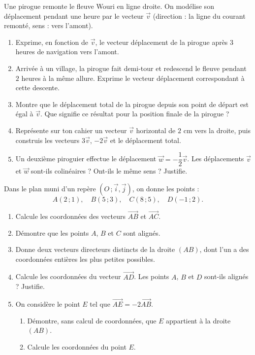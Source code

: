 \documentclass[11pt]{article}
\begin{document}
\begin{exercice}
Une pirogue remonte le fleuve Wouri en ligne droite. On modélise son déplacement pendant une heure par le vecteur $\vec{v}$ (direction : la ligne du courant remonté, sens : vers l'amont).
\begin{enumerate}
\item Exprime, en fonction de $\vec{v}$, le vecteur déplacement de la pirogue après $3$ heures de navigation vers l'amont.
\item Arrivée à un village, la pirogue fait demi-tour et redescend le fleuve pendant $2$ heures à la même allure. Exprime le vecteur déplacement correspondant à cette descente.
\item Montre que le déplacement total de la pirogue depuis son point de départ est égal à $\vec{v}$. Que signifie ce résultat pour la position finale de la pirogue ?
\item Représente sur ton cahier un vecteur $\vec{v}$ horizontal de $2$ cm vers la droite, puis construis les vecteurs $3\vec{v}$, $-2\vec{v}$ et le déplacement total.
\item Un deuxième piroguier effectue le déplacement $\vec{w} = -\dfrac{1}{2}\vec{v}$. Les déplacements $\vec{v}$ et $\vec{w}$ sont-ils colinéaires ? Ont-ils le même sens ? Justifie.
\end{enumerate}
\end{exercice}

\begin{exercice}
Dans le plan muni d'un repère $(O\,;\vec{i},\vec{j})$, on donne les points :
\[ A(2\,;1), \quad B(5\,;3), \quad C(8\,;5), \quad D(-1\,;2). \]
\begin{enumerate}
\item Calcule les coordonnées des vecteurs $\overrightarrow{AB}$ et $\overrightarrow{AC}$.
\item Démontre que les points $A$, $B$ et $C$ sont alignés.
\item Donne deux vecteurs directeurs distincts de la droite $(AB)$, dont l'un a des coordonnées entières les plus petites possibles.
\item Calcule les coordonnées du vecteur $\overrightarrow{AD}$. Les points $A$, $B$ et $D$ sont-ils alignés ? Justifie.
\item On considère le point $E$ tel que $\overrightarrow{AE} = -2\overrightarrow{AB}$.
\begin{enumerate}
\item[a)] Démontre, sans calcul de coordonnées, que $E$ appartient à la droite $(AB)$.
\item[b)] Calcule les coordonnées du point $E$.
\end{enumerate}
\end{enumerate}
\end{exercice}
\end{document}
